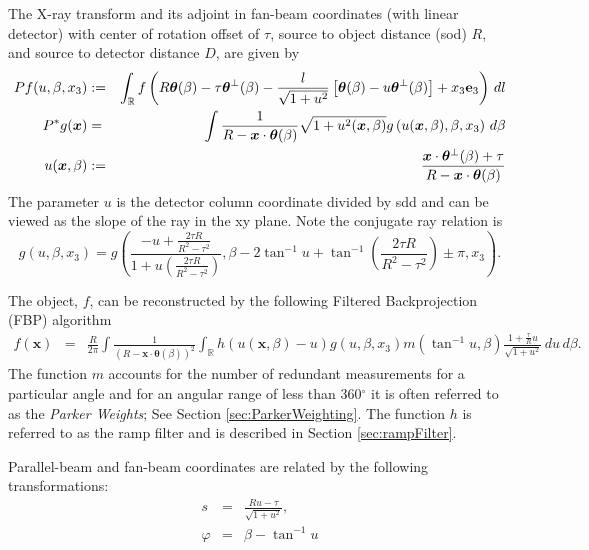 \documentclass[11pt]{article}
\begin{document}
The X-ray transform and its adjoint in fan-beam coordinates (with linear detector) with center of rotation offset of $\tau$, source to object distance (sod) $R$, and source to detector distance $D$, are given by
\begin{eqnarray*}
Pf(u,\beta,x_3) &:=& \int_\mathbb{R} f\left(R\bm{\theta}(\beta) - \tau\bm{\theta}^\perp(\beta) - \frac{l}{\sqrt{1+u^2}}\left[\bm{\theta}(\beta) - u\bm{\theta}^\perp(\beta) \right] + x_3\textbf{e}_3 \right) \, dl \\
P^*g(\bm{x}) &=& \int \frac{1}{R-\bm{x}\cdot\bm{\theta}(\beta)} \sqrt{1 + u^2(\bm{x},\beta)} g\left( u(\bm{x},\beta), \beta, x_3\right) \, d\beta \\
u(\bm{x},\beta) &:=& \frac{\bm{x}\cdot \bm{\theta}^\perp(\beta) + \tau}{R - \bm{x}\cdot\bm{\theta}(\beta)}
\end{eqnarray*}
The parameter $u$ is the detector column coordinate divided by sdd and can be viewed as the slope of the ray in the xy plane.  Note the conjugate ray relation is $$g(u,\beta,x_3) = g\left(\frac{-u+\frac{2\tau R}{R^2-\tau^2} }{1 + u\left(\frac{2\tau R}{R^2-\tau^2}\right)}, \beta-2\tan^{-1}u + \tan^{-1}\left(\frac{2\tau R}{R^2-\tau^2}\right) \pm \pi, x_3 \right).$$

The object, $f$, can be reconstructed by the following Filtered Backprojection (FBP) algorithm
\begin{eqnarray*}
f(\bm{x}) &=& \frac{R}{2\pi} \int \frac{1}{(R-\bm{x}\cdot\bm{\theta}(\beta))^2} \int_\mathbb{R} h\left( u(\bm{x},\beta) - u \right) g(u, \beta, x_3) m(\tan^{-1}u,\beta) \frac{1 + \frac{\tau}{R}u}{\sqrt{1+u^2}} \, du \, d\beta.
\end{eqnarray*}
The function $m$ accounts for the number of redundant measurements for a particular angle and for an angular range of less than 360$^\circ$ it is often referred to as the \textit{Parker Weights}; See Section \ref{sec:ParkerWeighting}.  The function $h$ is referred to as the ramp filter and is described in Section \ref{sec:rampFilter}.


Parallel-beam and fan-beam coordinates are related by the following transformations:
\begin{eqnarray*}
s &=& \frac{Ru-\tau}{\sqrt{1+u^2}}, \\
\varphi &=& \beta - \tan^{-1}u %
\end{eqnarray*}
\end{document}

